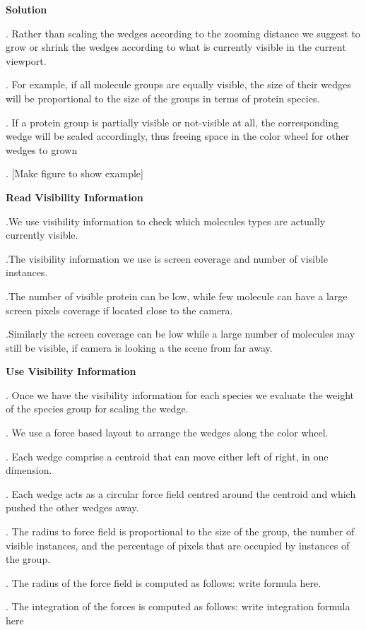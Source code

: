 \documentclass[review,journal]{vgtc}         %
\begin{document}
\textbf{Solution}

. Rather than scaling the wedges according to the zooming distance we suggest to grow or shrink the wedges according to what is currently visible in the current viewport.

. For example, if all molecule groups are equally visible, the size of their wedges will be proportional to the size of the groups in terms of protein species.

. If a protein group is partially visible or not-visible at all, the corresponding wedge will be scaled accordingly, thus freeing space in the color wheel for other wedges to grown

. [Make figure to show example]


\textbf{Read Visibility Information}

.We use visibility information to check which molecules types are actually currently visible.

.The visibility information we use is screen coverage and number of visible instances.

.The number of visible protein can be low, while few molecule can have a large screen pixels coverage if located close to the camera.

.Similarly the screen coverage can be low while a large number of molecules may still be visible, if camera is looking a the scene from far away.


\textbf{Use Visibility Information}

. Once we have the visibility information for each species we evaluate the weight of the species group for scaling the wedge.

. We use a force based layout to arrange the wedges along the color wheel.

. Each wedge comprise a centroid that can move either left of right, in one dimension.


. Each wedge acts as a circular force field centred around the centroid and which pushed the other wedges away.

. The radius to force field is proportional to the size of the group, the number of visible instances, and the percentage of pixels that are occupied by instances of the group.

. The radius of the force field is computed as follows: write formula here.

. The integration of the forces is computed as follows: write integration formula here
\end{document}
